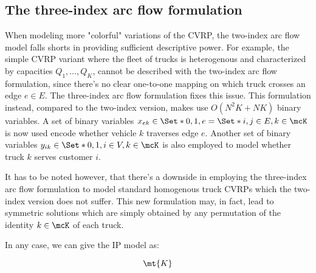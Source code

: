 \subsection{The three-index arc flow formulation}
\label{sec:intro-cvrp-three-index-flow-formulation}

When modeling more "colorful" variations of the CVRP, the two-index arc flow model falls shorts in providing sufficient descriptive power.
For example, the simple CVRP variant where the fleet of trucks is heterogenous and characterized by capacities $Q_1, \dots, Q_K$,
cannot be described with the two-index arc flow formulation, since there's no clear one-to-one mapping on which truck crosses an edge $e \in E$.
The three-index arc flow formulation fixes this issue.
This formulation instead, compared to the two-index version, makes use $O(N^2 K + N K)$ binary variables.
A set of binary variables $x_{ek} \in \Set*{0, 1}, e = \Set*{i, j} \in E, k \in \mcK$ is now used encode whether vehicle $k$ traverses edge $e$.
Another set of binary variables $y_{ik} \in \Set*{0, 1}, i \in V, k \in \mcK$ is also employed to model whether truck $k$ serves customer $i$.

It has to be noted however, that there's a downside in employing the three-index arc flow formulation to model standard homogenous truck CVRPs which the two-index version does not suffer.
This new formulation may, in fact, lead to symmetric solutions which are simply obtained by any permutation of the identity $k \in \mcK$ of each truck.

In any case, we can give the IP model as:

$$
\mt{K}
$$

